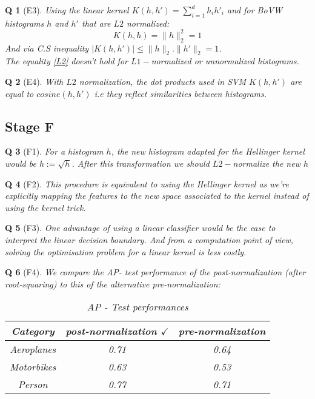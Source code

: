 \documentclass[11pt]{article}
\theoremstyle{exo}
\newtheorem*{exercise}{Q}
\newcommand{\1}{\mathbf{1}}
\newcommand{\0}{\mathbf{0}}
\begin{document}
\begin{exercise}[E3]
	Using the linear kernel $K(h,h')=\sum\limits_{i=1}^dh_ih'_i$ and for BoVW histograms $h$ and $h'$ that are $L2$ normalized:
	\begin{equation} 
	\label{L2}
	K(h,h)=\|h\|^2_2=1
	\end{equation} 
	And via C.S inequality $|K(h,h')|\leq \|h\|_2.\|h'\|_2=1$.\\
	The equality \ref{L2} doesn't hold for $L1-$normalized or unnormalized histograms.
\end{exercise}

\begin{exercise}[E4]
	With $L2$ normalization, the dot products used in SVM $K(h,h')$ are equal to $cosine(h,h')$  i.e they reflect similarities between histograms.
\end{exercise}

\subsection*{Stage F}
\begin{exercise}[F1]
	For a histogram $h$, the new histogram adapted for the Hellinger kernel would be $h:=\sqrt{h}$. After this transformation we should $L2-$normalize the new $h$
\end{exercise}

\begin{exercise}[F2]
	This procedure is equivalent to using the Hellinger kernel as we're explicitly mapping the features to the new space associated to the kernel instead of using the kernel trick.
\end{exercise}

\begin{exercise}[F3]
	One advantage of using a linear classifier would be the ease to interpret the linear decision boundary. And from a computation point of view, solving the optimisation problem for a linear kernel is less costly. 
\end{exercise}

\begin{exercise}[F4]
	We compare the AP- test performance of the post-normalization (after root-squaring) to this of the alternative pre-normalization:
		\begin{table}[H]
		\centering
		\caption{AP - Test performances}
		\begin{tabular}{||c|c|c||}
		\hline
		Category & post-normalization $\checkmark$ & pre-normalization\\
		\hline
		Aeroplanes & 0.71 & 0.64\\
		Motorbikes & 0.63 & 0.53\\
		Person &  0.77 & 0.71\\
		\hline
		\end{tabular}
		\end{table}
\end{exercise}
\end{document}
